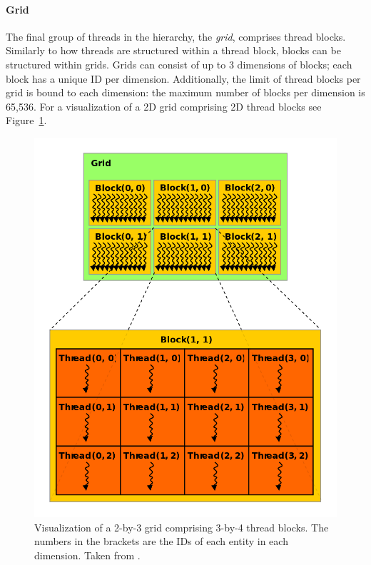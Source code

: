 \paragraph{Grid} The final group of threads in the hierarchy, the \textit{grid}, comprises thread blocks.
Similarly to how threads are structured within a thread block, blocks can be structured within grids.
Grids can consist of up to 3 dimensions of blocks; each block has a unique ID per dimension.
Additionally, the limit of thread blocks per grid is bound to each dimension: the maximum number of blocks per dimension is 65,536.
For a visualization of a 2D grid comprising 2D thread blocks see Figure~\ref{Figure:theory->CUDA->thread-management->thread-management-system-overview}.

\begin{figure}[ht!]
	\centering
	\includegraphics[width=12cm, keepaspectratio]{images/ch01/CUDA_thread_management_system_overview.png}
	\caption{Visualization of a 2-by-3 grid comprising 3-by-4 thread blocks.
		The numbers in the brackets are the IDs of each entity in each dimension.
		Taken from  \cite{NVIDIADecember2022}.
	}
	\label{Figure:theory->CUDA->thread-management->thread-management-system-overview}
\end{figure}


